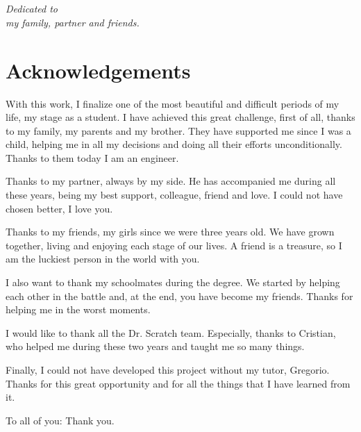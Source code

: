 

\chapter*{}
\begin{flushright}
\textit{Dedicated to \\
my family, partner and friends.}
\end{flushright}


\chapter*{Acknowledgements}

With this work, I finalize one of the most beautiful and difficult periods of my life, my stage as a student. I have achieved this great challenge, first of all, thanks to my family, my parents and my brother. They have supported me since I was a child, helping me in all my decisions and doing all their efforts unconditionally. Thanks to them today I am an engineer.  

Thanks to my partner, always by my side. He has accompanied me during all these years, being my best support, colleague, friend and love. I could not have chosen better, I love you.

Thanks to my friends, my girls since we were three years old. We have grown together, living and enjoying each stage of our lives. A friend is a treasure, so I am the luckiest person in the world with you. 

I also want to thank my schoolmates during the degree. We started by helping each other in the battle and, at the end, you have become my friends. Thanks for helping me in the worst moments.

I would like to thank all the Dr. Scratch team. Especially, thanks to Cristian, who helped me during these two years and taught me so many things.

Finally, I could not have developed this project without my tutor, Gregorio. Thanks for this great opportunity and for all the things that I have learned from it.

To all of you: Thank you.




